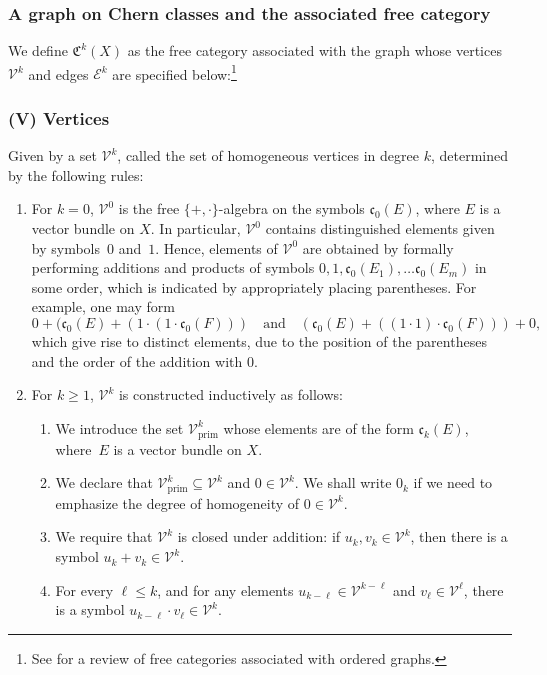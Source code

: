 \documentclass[11pt]{article}
\newcommand{\quand}{\quad\text{and}\quad}
\theoremstyle{plain}
\theoremstyle{definition}
\newcommand{\Ecal}{\mathcal E}
\newcommand{\Vcal}{\mathcal V}
\newcommand{\Cfrak}{\mathfrak C}
\newcommand{\cfrak}{\mathfrak c}
\newcommand{\prim}{\mathrm{prim}}
\begin{document}
\subsubsection*{A graph on Chern classes and the associated free category} We define $\Cfrak^{k}(X)$ as the free category associated with the graph whose vertices $\Vcal^{k}$ and edges $\Ecal^{k}$ are specified below:\footnote{See \cite[Chap.\,II, Section 7]{MacLane-cat} for a review of free categories associated with ordered graphs.}

\subsubsection*{\textup{(V)} Vertices}
Given by a set $\Vcal^k$, called the set of homogeneous vertices in degree $k$, determined by the following rules:
\begin{enumerate}
\item For $k=0$, $\Vcal^{0}$ is the free $\lbrace +,\cdot\rbrace$-algebra on the symbols $\cfrak_{0}(E)$, where $E$ is a vector bundle on $X$. In particular, $\Vcal^{0}$ contains distinguished elements given by symbols~$0$ and~$1$. Hence, elements of $\Vcal^{0}$ are obtained by formally performing additions and products of symbols $0, 1,\cfrak_{0}(E_{1}),\ldots\cfrak_{0}(E_{m})$ in some order, which is indicated by appropriately placing parentheses. For example, one may form
\begin{displaymath}
0+(\cfrak_{0}(E) + (1 \cdot (1 \cdot \cfrak_{0}(F))) \quand (\cfrak_{0}(E) + ((1 \cdot 1) \cdot\cfrak_{0}(F)))+0,
\end{displaymath}
which give rise to distinct elements, due to the position of the parentheses and the order of the addition with 0.

\item For $k \geq 1$, $\Vcal^k$ is constructed inductively as follows:
\begin{enumerate}
\item We introduce the set $\Vcal^k_{\prim}$ whose elements are of the form $\cfrak_{k}(E)$, where~$E$ is a vector bundle on $X$.

\item We declare that $\Vcal^k_{\prim} \subseteq \Vcal^k$ and $0 \in \Vcal^k$. We shall write $0_{k}$ if we need to emphasize the degree of homogeneity of $0 \in \Vcal^k$.

\item We require that $\Vcal^{k}$ is closed under addition: if $u_k, v_k \in \Vcal^k$, then there is a symbol $u_k + v_k \in \Vcal^k$.

\item For every $\ell\leq k$, and for any elements $u_{k-\ell} \in \Vcal^{k-\ell}$ and $ v_\ell \in \Vcal^{\ell}$, there is a symbol $u_{k-\ell} \cdot v_{\ell} \in \Vcal^{k}$.
\end{enumerate}
\end{enumerate}
\end{document}
